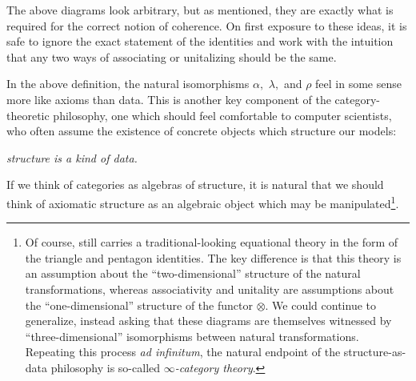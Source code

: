 The above diagrams look arbitrary, but as mentioned, they are exactly what is
required for the correct notion of coherence. On first exposure to these ideas,
it is safe to ignore the exact statement of the identities and work with the
intuition that any two ways of associating or unitalizing should be the same.

In the above definition, the natural isomorphisms $\alpha,$ $\lambda,$ and
$\rho$ feel in some sense more like axioms than data. This is another key
component of the category-theoretic philosophy, one which should feel
comfortable to computer scientists, who often assume the existence of concrete
objects which structure our models:\begin{center}
  \emph{
    structure is a kind of data.
  }
\end{center}
If we think of categories as algebras of structure, it is natural that we should
think of axiomatic structure as an algebraic object which may be
manipulated\footnote{
  Of course, 
  still carries a traditional-looking equational theory in the form of the
  triangle and pentagon identities. The key difference is that this theory is an
  assumption about the ``two-dimensional'' structure of the natural
  transformations, whereas associativity and unitality are assumptions about the
  ``one-dimensional'' structure of the functor $\otimes$. We could continue to
  generalize, instead asking that these diagrams are themselves witnessed by
  ``three-dimensional'' isomorphisms between natural transformations. Repeating
  this process \emph{ad infinitum}, the natural endpoint of the
  structure-as-data philosophy is so-called \emph{$\infty$-category theory}.
}.

